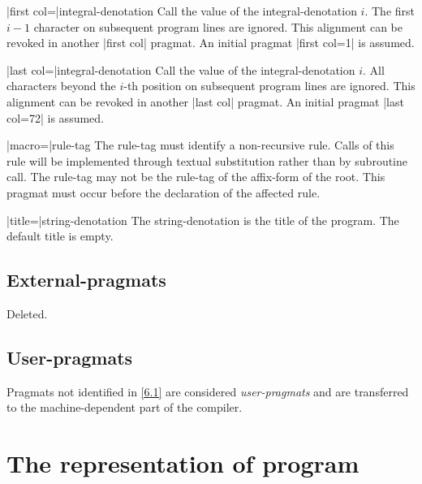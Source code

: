 \documentclass{article}
\newcommand\g[1]{{\sf #1}}
\let\oref\ref
\let\ref\oref
\begin{document}
\X\pp|first col=|\g{integral-denotation}\Y
Call the value of the \g{integral-denotation} $i$. The first $i-1$
character on subsequent program lines are ignored. This alignment can be
revoked in another \pp|first col| pragmat. An initial pragmat \pp|first
col=1| is assumed.

\X\pp|last col=|\g{integral-denotation}\Y
Call the value of the \g{integral-denotation} $i$. All characters beyond the
$i$-th position on subsequent program lines are ignored. This alignment can
be revoked in another \pp|last col| pragmat. An initial pragmat \pp|last
col=72| is assumed.

\X\pp|macro=|\g{rule-tag}\Y
The \g{rule-tag} must identify a non-recursive rule. Calls of this rule will be
implemented through textual substitution rather than by subroutine call.
The \g{rule-tag} may not be the \g{rule-tag} of the \g{affix-form} of the
\g{root}. This pragmat must occur before the declaration of the affected
rule.

\X\pp|title=|\g{string-denotation}\Y
The \g{string-denotation} is the title of the program. The default title is
empty.

\subsection{External-pragmats}\label{6.2}

Deleted.

\subsection{User-pragmats}\label{6.3}

Pragmats not identified in \ref{6.1} are considered
\emph{user-pragmats} and are transferred to the machine-dependent part of the
compiler.

\newpage
\section{The representation of program}\label{sec:7}
\end{document}
